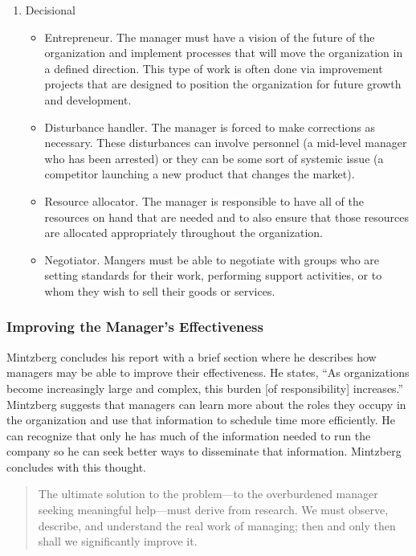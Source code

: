 \begin{enumerate}
	\item Decisional
	\begin{itemize}
		\item Entrepreneur. The manager must have a vision of the future of the organization and implement processes that will move the organization in a defined direction. This type of work is often done via improvement projects that are designed to position the organization for future growth and development.
		\item Disturbance handler. The manager is forced to make corrections as necessary. These disturbances can involve personnel (\eg a mid-level manager who has been arrested) or they can be some sort of systemic issue (\eg a competitor launching a new product that changes the market).
		\item Resource allocator. The manager is responsible to have all of the resources on hand that are needed and to also ensure that those resources are allocated appropriately throughout the organization.
		\item Negotiator. Mangers must be able to negotiate with groups who are setting standards for their work, performing support activities, or to whom they wish to sell their goods or services. 
	\end{itemize}

\end{enumerate}

\subsubsection{Improving the Manager's Effectiveness}

Mintzberg concludes his report with a brief section where he describes how managers may be able to improve their effectiveness. He states, ``As organizations become increasingly large and complex, this burden [of responsibility] increases.'' Mintzberg suggests that managers can learn more about the roles they occupy in the organization and use that information to schedule time more efficiently. He can recognize that only he has much of the information needed to run the company so he can seek better ways to disseminate that information. Mintzberg concludes with this thought.

\begin{quote}
	The ultimate solution to the problem---to the overburdened manager seeking meaningful 	help---must derive from research. We must observe, describe, and understand the real work of managing; then and only then shall we significantly improve it.
\end{quote}

